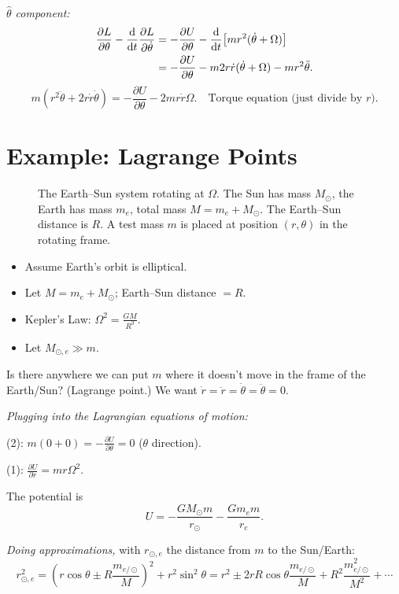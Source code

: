 \textit{$\hat{\theta}$ component:}
\begin{align*}
    \frac{\partial L}{\partial \theta} - \dv{t}\frac{\partial L}{\partial \dot{\theta}}
    &= -\frac{\partial U}{\partial \theta} - \dv{t}\!\left[mr^2(\dot{\theta}+\Omega)\right] \\
    &= -\frac{\partial U}{\partial \theta} - m2r\dot{r}(\dot{\theta}+\Omega) - mr^2\ddot{\theta}.
\end{align*}
\[
    \boxed{m(r^2\ddot{\theta} + 2r\dot{r}\dot{\theta}) = -\frac{\partial U}{\partial\theta} - 2mr\dot{r}\Omega.}
    \quad \text{Torque equation (just divide by }r\text{).} \tag{2}
\]

\section{Example: Lagrange Points}

\begin{figure}[H]
    \centering
    \caption{The Earth--Sun system rotating at $\Omega$. The Sun has mass $M_\odot$,
    the Earth has mass $m_e$, total mass $M = m_e + M_\odot$. The Earth--Sun
    distance is $R$. A test mass $m$ is placed at position $(r,\theta)$ in the
    rotating frame.}
\end{figure}

\begin{itemize}
    \item Assume Earth's orbit is elliptical.
    \item Let $M = m_e + M_\odot$; Earth--Sun distance $= R$.
    \item Kepler's Law: $\Omega^2 = \frac{GM}{R^3}$.
    \item Let $M_{\odot,e} \gg m$.
\end{itemize}

Is there anywhere we can put $m$ where it doesn't move in the frame of the
Earth/Sun? (Lagrange point.)  We want $\dot{r} = \ddot{r} = \dot{\theta} = \ddot{\theta} = 0$.

\textit{Plugging into the Lagrangian equations of motion:}

(2): $m(0 + 0) = -\frac{\partial U}{\partial\theta} = 0$ ($\theta$ direction).

(1): $\frac{\partial U}{\partial r} = mr\Omega^2$.

The potential is
\[
    U = -\frac{GM_\odot m}{r_\odot} - \frac{Gm_e m}{r_e}.
\]

\textit{Doing approximations,} with $r_{\odot,e}$ the distance from $m$ to the Sun/Earth:
\[
    r_{\odot,e}^2
    = \left(r\cos\theta \pm R\frac{m_{e/\odot}}{M}\right)^2 + r^2\sin^2\theta
    = r^2 \pm 2rR\cos\theta\frac{m_{e/\odot}}{M} + R^2\frac{m_{e/\odot}^2}{M^2} + \cdots
\]

